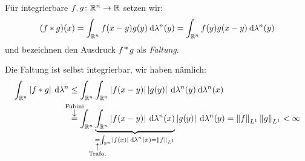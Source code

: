 \documentclass[skript.tex]{subfiles}
\begin{document}
	\begin{defin}[Faltung]
		Für integrierbare $f,g \colon \mathbb{R}^n\to\mathbb{R}$ setzen wir:
		\[
			(f\ast g)(x) = \int_{\mathbb{R}^n} f(x-y)g(y) \: \mathrm{d}\lambda^n(y)
			= \int_{\mathbb{R}^n} f(y)g(x-y) \: \mathrm{d}\lambda^n(y)
		\] und bezeichnen den Ausdruck $f \ast g$ als \emph{Faltung}.
	\end{defin}
	Die Faltung ist selbst integrierbar, wir haben nämlich:
	\begin{align*}
		\int_{\mbb{R}^n}\abs{f \ast g} \md \lambda^n
		&\leq \int_{\mbb{R}^n} \int_{\mbb{R}^n} \abs{f(x-y)}\abs{g(y)} \md \lambda^n(y)  \md \lambda^n(x) \\
		&\darrow{\text{Fubini}}{=} \int_{\mbb{R}^n} \underbrace{\int_{\mbb{R}^n} \abs{f(x-y)} \md \lambda^n(x)}_{\mathclap{
			\uarrow{\text{Trafo.}}{=} \int_{\mbb{R}^n} \abs{f(x)} \md \lambda^n(x) = \norm{f}_{L^1}
		}} \abs{g(y)} \md \lambda^n(y) = \norm{f}_{L^1} \norm{g}_{L^1} < \infty
	\end{align*}
	
\end{document}
